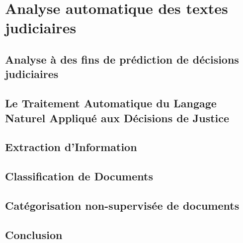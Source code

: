 %
\chapter{Analyse automatique des textes judiciaires}
\label{sec:literature}


\section{Analyse à des fins de prédiction de décisions judiciaires}
\label{sec:literature:legalpredict}

\section{Le Traitement Automatique du Langage Naturel Appliqué aux Décisions de Justice}
\label{sec:literature:legaltal}


\section{Extraction d'Information}
\label{sec:literature:generalie}

\section{Classification de Documents}
\label{sec:literature:classification}

\section{Catégorisation non-supervisée de documents}
\label{sec:literature:clustering}

\section{Conclusion}
\label{sec:literature:conclusion}
